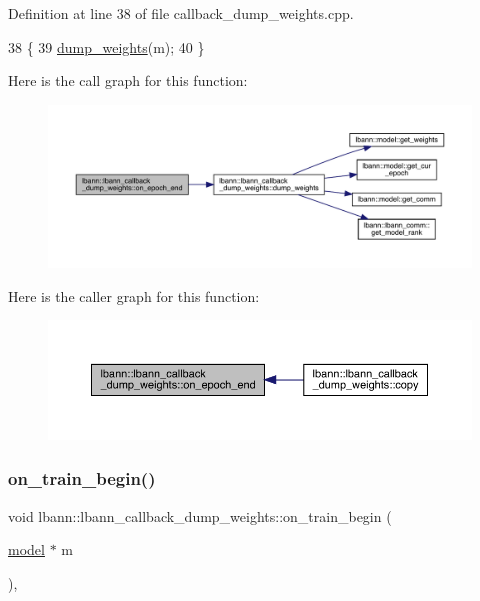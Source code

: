 Definition at line 38 of file callback\+\_\+dump\+\_\+weights.\+cpp.


\begin{DoxyCode}
38                                                        \{
39   \hyperlink{classlbann_1_1lbann__callback__dump__weights_a5902fb87255b410a5d777ea385813416}{dump\_weights}(m);
40 \}
\end{DoxyCode}
Here is the call graph for this function\+:\nopagebreak
\begin{figure}[H]
\begin{center}
\leavevmode
\includegraphics[width=350pt]{classlbann_1_1lbann__callback__dump__weights_aa73068d94b2408fc0124b2a05b4e2b8a_cgraph}
\end{center}
\end{figure}
Here is the caller graph for this function\+:\nopagebreak
\begin{figure}[H]
\begin{center}
\leavevmode
\includegraphics[width=350pt]{classlbann_1_1lbann__callback__dump__weights_aa73068d94b2408fc0124b2a05b4e2b8a_icgraph}
\end{center}
\end{figure}
\mbox{\label{classlbann_1_1lbann__callback__dump__weights_a46db01d535414a0965caae709a08a150}} 
\subsubsection{\texorpdfstring{on\+\_\+train\+\_\+begin()}{on\_train\_begin()}}
{\footnotesize\ttfamily void lbann\+::lbann\+\_\+callback\+\_\+dump\+\_\+weights\+::on\+\_\+train\+\_\+begin (\begin{DoxyParamCaption}\item[{\hyperlink{classlbann_1_1model}{model} $\ast$}]{m }\end{DoxyParamCaption})\hspace{0.3cm}{\ttfamily [override]}, {\ttfamily [virtual]}}

